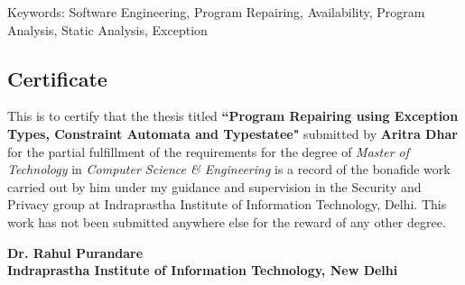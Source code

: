 \documentclass[letterpaper,11pt]{report}
\begin{document}


\newpage

\pagestyle{empty}
\vspace*{7.1in} 
Keywords: Software Engineering, Program Repairing, Availability, Program
Analysis, Static Analysis, Exception

\newpage

\begin{center}
\section*{Certificate}
\label{section:certificate}
\end{center}

This is to certify that the thesis titled \textbf{``Program Repairing using
Exception Types, Constraint Automata and Typestatee"} submitted by
\textbf{Aritra Dhar} for the partial fulfillment of the requirements for the
degree of \emph{Master of Technology} in \emph{Computer Science \& Engineering}
is a record of the bonafide work carried out by him under my guidance and
supervision in the Security and Privacy group at Indraprastha Institute of
Information Technology, Delhi. This work has not been submitted anywhere else
for the reward of any other degree. \\ \vspace{0.5in}

\textbf{Dr. Rahul Purandare}\\
\textbf{Indraprastha Institute of Information Technology, New Delhi}
\doublespacing



\newpage
\pagestyle{empty}

\newpage



\newpage

\tableofcontents
\listoffigures 
\listoftables

\newpage

\newpage

\newpage
\mbox{}


{}
\setcounter{page}{1}
\doublespacing
\end{document}

